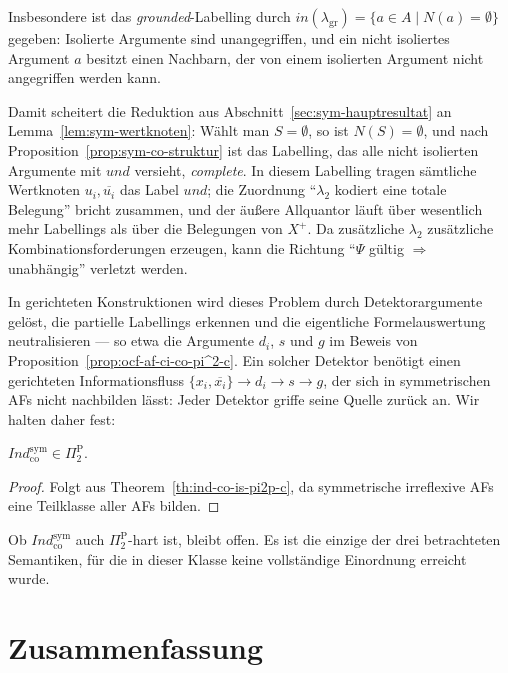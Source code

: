 Insbesondere ist das \textit{grounded}-Labelling durch
\(\mathit{in}(\lambda_{\mathrm{gr}})=\{a\in A\mid N(a)=\emptyset\}\) gegeben:
Isolierte Argumente sind unangegriffen, und ein nicht isoliertes Argument \(a\)
besitzt einen Nachbarn, der von einem isolierten Argument nicht angegriffen
werden kann.

Damit scheitert die Reduktion aus Abschnitt~\ref{sec:sym-hauptresultat} an
Lemma~\ref{lem:sym-wertknoten}: Wählt man \(S=\emptyset\), so ist
\(N(S)=\emptyset\), und nach Proposition~\ref{prop:sym-co-struktur} ist das
Labelling, das alle nicht isolierten Argumente mit \(\mathit{und}\) versieht,
\textit{complete}. In diesem Labelling tragen sämtliche Wertknoten
\(u_i,\overline{u_i}\) das Label \(\mathit{und}\); die Zuordnung
\enquote{\(\lambda_2\) kodiert eine totale Belegung} bricht zusammen, und der
äußere Allquantor läuft über wesentlich mehr Labellings als über die
Belegungen von \(X^{+}\). Da zusätzliche \(\lambda_2\) zusätzliche
Kombinationsforderungen erzeugen, kann die Richtung
\enquote{\(\Psi\) gültig \(\Rightarrow\) unabhängig} verletzt werden.

In gerichteten Konstruktionen wird dieses Problem durch Detektorargumente
gelöst, die partielle Labellings erkennen und die eigentliche Formelauswertung
neutralisieren --- so etwa die Argumente \(d_i\), \(s\) und \(g\) im Beweis von
Proposition~\ref{prop:ocf-af-ci-co-pi^2-c}. Ein solcher Detektor benötigt einen
gerichteten Informationsfluss \(\{x_i,\overline{x_i}\}\to d_i\to s\to g\), der
sich in symmetrischen AFs nicht nachbilden lässt: Jeder Detektor griffe seine
Quelle zurück an. Wir halten daher fest:

\begin{Proposition}
    \label{prop:sym-co-obere-schranke}
    \(\textit{Ind}^{\mathrm{sym}}_{\mathrm{co}}\in\Pi_2^\text{P}\).
\end{Proposition}

\begin{proof}
    Folgt aus Theorem~\ref{th:ind-co-is-pi2p-c}, da symmetrische irreflexive
    AFs eine Teilklasse aller AFs bilden.
\end{proof}

Ob \(\textit{Ind}^{\mathrm{sym}}_{\mathrm{co}}\) auch \(\Pi_2^\text{P}\)-hart
ist, bleibt offen. Es ist die einzige der drei betrachteten Semantiken, für die
in dieser Klasse keine vollständige Einordnung erreicht wurde.

\section{Zusammenfassung}
\label{sec:sym-zusammenfassung}

